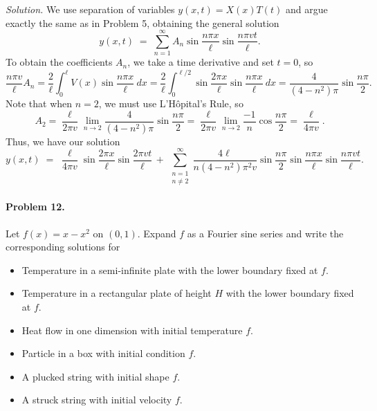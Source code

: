 \documentclass[10pt]{article}
\begin{document}
        \textit{Solution.} We use separation of variables $y(x, t) = X(x)T(t)$ and argue exactly the same as in Problem 5,
        obtaining the general solution
        \[
                y(x, t) \;=\; \sum_{n = 1}^\infty A_n\sin\frac{n\pi x}{\ell} \sin\frac{n\pi vt}{\ell}.
        \]
        To obtain the coefficients $A_n$, we take a time derivative and set $t=0$, so
        \[
                \frac{n\pi v}{\ell}A_n = \frac{2}{\ell}\int_0^\ell V(x) \sin\frac{n\pi x}{\ell}\: dx 
                        = \frac{2}{\ell} \int_0^{\ell/2} \sin\frac{2\pi x}{\ell}\sin\frac{n\pi x}{\ell}\:dx
                        = \frac{4}{(4 - n^2)\pi}\sin\frac{n\pi}{2}.
        \]
        Note that when $n = 2$, we must use L'H\^{o}pital's Rule, so
        \[
                A_2 = \frac{\ell}{2\pi v}\lim_{n \to 2} \frac{4}{(4 - n^2)\pi}\sin\frac{n\pi}{2} 
                        = \frac{\ell}{2\pi v}\lim_{n \to 2}\frac{-1}{n}\cos\frac{n\pi}{2}
                        = \frac{\ell}{4 \pi v}.
        \]
        Thus, we have our solution
        \[
                y(x, t) \;=\; \frac{\ell}{4 \pi v}\sin\frac{2\pi x}{\ell}\sin\frac{2\pi vt}{\ell} \,+\,
                \sum_{\substack{n = 1 \\n \neq 2}}^\infty \frac{4\ell}{n(4 - n^2)\pi^2 v}\sin\frac{n\pi}{2}\sin\frac{n\pi x}{\ell} \sin\frac{n\pi vt}{\ell}.
        \]

        \paragraph{Problem 12.} Let $f(x) = x - x^2$ on $(0, 1)$. Expand $f$ as a Fourier sine series and write the corresponding solutions
        for
        \begin{itemize}
                \item Temperature in a semi-infinite plate with the lower boundary fixed at $f$.
                \item Temperature in a rectangular plate of height $H$ with the lower boundary fixed at $f$.
                \item Heat flow in one dimension with initial temperature $f$.
                \item Particle in a box with initial condition $f$.
                \item A plucked string with initial shape $f$.
                \item A struck string with initial velocity $f$.
        \end{itemize}
\end{document}

